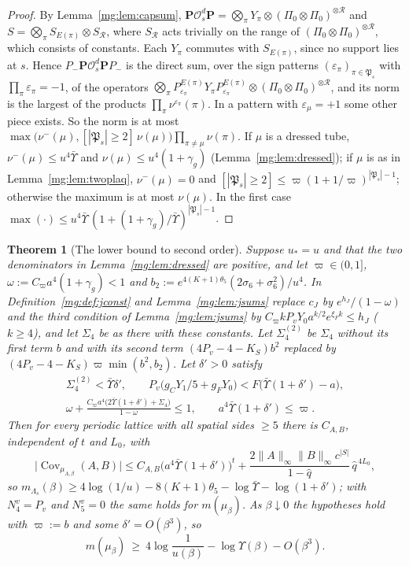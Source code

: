 \documentclass[11pt,a4paper]{article}
\newtheorem{theorem}{Theorem}[section]
\theoremstyle{definition}
\theoremstyle{remark}
\DeclareMathOperator{\Cov}{Cov}
\newcommand{\norm}[1]{\lVert #1\rVert}
\begin{document}
\begin{proof}
By Lemma~\ref{mg:lem:capsum}, $\mathbf P\mathcal O^d_s\mathbf P=\bigotimes_\pi Y_\pi\otimes(\Pi_0\otimes\Pi_0)^{\otimes\mathcal R}$ and $S=\bigotimes_\pi S_{E(\pi)}\otimes S_{\mathcal R}$,
where $S_{\mathcal R}$ acts trivially on the range of $(\Pi_0\otimes\Pi_0)^{\otimes\mathcal R}$, which consists of constants. Each $Y_\pi$ commutes with $S_{E(\pi)}$, since no
support lies at $s$. Hence $P_-\mathbf P\mathcal O^d_s\mathbf PP_-$ is the direct sum, over the sign patterns $(\varepsilon_\pi)_{\pi\in\mathfrak P_s}$ with $\prod_\pi\varepsilon_\pi=-1$, of
the operators $\bigotimes_\pi P^{E(\pi)}_{\varepsilon_\pi}Y_\pi P^{E(\pi)}_{\varepsilon_\pi}\otimes(\Pi_0\otimes\Pi_0)^{\otimes\mathcal R}$, and its norm is the largest of the products
$\prod_\pi\nu^{\varepsilon_\pi}(\pi)$. In a pattern with $\varepsilon_\mu=+1$ some other piece exists. So the norm is at most
$\max\bigl(\nu^-(\mu),[|\mathfrak P_s|\ge2]\,\nu(\mu)\bigr)\prod_{\pi\ne\mu}\nu(\pi)$. If $\mu$ is a dressed tube, $\nu^-(\mu)\le u^4\bar\Upsilon$ and $\nu(\mu)\le u^4(1+\gamma_g)$
(Lemma~\ref{mg:lem:dressed}); if $\mu$ is as in Lemma~\ref{mg:lem:twoplaq}, $\nu^-(\mu)=0$ and $[|\mathfrak P_s|\ge2]\le\varpi(1+1/\varpi)^{|\mathfrak P_s|-1}$; otherwise the maximum is at most
$\nu(\mu)$. In the first case $\max(\cdot)\le u^4\bar\Upsilon\,(1+(1+\gamma_g)/\bar\Upsilon)^{|\mathfrak P_s|-1}$.
\end{proof}

\begin{theorem}[The lower bound to second order]\label{mg:thm:lower2}
Suppose $u_*=u$ and that the two denominators in Lemma~\ref{mg:lem:dressed} are positive, and let $\varpi\in(0,1]$, $\omega:=C_\varpi a^4(1+\gamma_g)<1$ and $b_2:=e^{4(K+1)\theta_5}(2\sigma_6+\sigma_6^2)/u^4$. In
Definition~\ref{mg:def:jconst} and Lemma~\ref{mg:lem:jsums} replace $c_J$ by $e^{h_J}/(1-\omega)$ and the third condition of Lemma~\ref{mg:lem:jsums} by
$C_\varpi kP_vY_0a^{k/2}e^{\xi_Fk}\le h_J$ ($k\ge4$), and let $\Sigma_4$ be as there with these constants. Let $\Sigma^{(2)}_4$ be $\Sigma_4$ without its first term
$b$ and with its second term $(4P_v-4-K_S)b^2$ replaced by $(4P_v-4-K_S)\varpi\min(b^2,b_2)$. Let $\delta'>0$ satisfy
\begin{gather*}
\Sigma^{(2)}_4<\bar\Upsilon\delta',\qquad P_v\bigl(g_CY_1/5+g_FY_0\bigr)<F\bigl(\bar\Upsilon(1+\delta')-a\bigr),\\
\omega+\frac{C_\varpi a^4\bigl(2\bar\Upsilon(1+\delta')+\Sigma_4\bigr)}{1-\omega}\le1,\qquad a^4\bar\Upsilon(1+\delta')\le\varpi .
\end{gather*}
Then for every periodic lattice with all spatial sides $\ge5$ there is $C_{A,B}$, independent of $t$ and $L_0$, with
\[
\bigl|\Cov_{\mu_{\Lambda,\beta}}(A,B)\bigr|\le C_{A,B}\bigl(a^4\bar\Upsilon(1+\delta')\bigr)^t+\frac{2\norm A_\infty\norm B_\infty c^{|S|}}{1-\hat q}\,\hat q^{\,4L_0},
\]
so $m_{\Lambda_s}(\beta)\ge4\log(1/u)-8(K+1)\theta_5-\log\bar\Upsilon-\log(1+\delta')$; with $N^v_4=P_v$ and $N^v_5=0$ the same holds for
$m(\mu_\beta)$. As $\beta\downarrow0$ the hypotheses hold with $\varpi:=b$ and some $\delta'=O(\beta^3)$, so
\[
m(\mu_\beta)\ \ge\ 4\log\frac1{u(\beta)}-\log\Upsilon(\beta)-O(\beta^3).
\]
\end{theorem}
\end{document}
